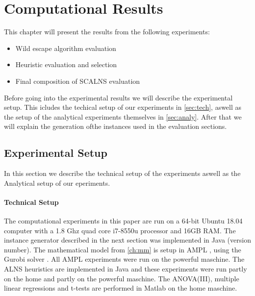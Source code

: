 \documentclass[../main.tex]{subfiles}
\begin{document}
                                                
\chapter{Computational Results}
\label{ch:res}
This chapter will present the results from the following experiments:
\begin{itemize}
    \item Wild escape algorithm evaluation

    \item Heuristic evaluation and selection

    \item Final composition of SCALNS evaluation

\end{itemize}

Before going into the experimental results we will describe the experimental setup.
This icludes the techical setup of our experiments in \cref{sec:tech}, aswell as the setup of the analytical experiments themselves in \cref{sec:analy}.
After that we will explain the generation ofthe instances used in the evaluation sections.

\section{Experimental Setup}
\label{sec:setup}
In this section we describe the technical setup of the experiments aswell as the Analytical setup of our eperiments.
\subsubsection{Technical Setup}
The computational experiments in this paper are run on a 64-bit Ubuntu 18.04 computer with a 1.8 Ghz quad core i7-8550u processor and 16GB RAM. 
The instance generator described in the next section was implemented in Java (version number).
The mathematical model from \cref{ch:mm} is setup in AMPL \citep{ampl}, using the Gurobi solver \citep{gurobi}.  
All AMPL experiments were run on the powerful maschine.
The ALNS heuristics are implemented in Java \citep{java} and these experiments were run partly on the home and partly on the powerful maschine.
The ANOVA(III), multiple linear regressions and t-tests are performed in Matlab \citep{matlab} on the home maschine.
\end{document}
